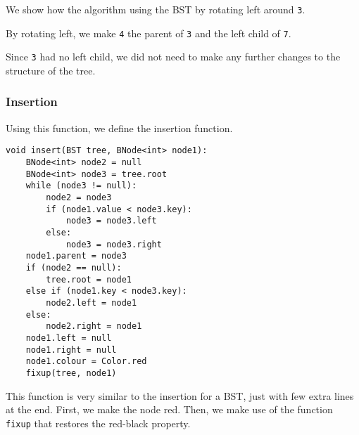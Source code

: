 \documentclass[a4paper, openany]{memoir}
\begin{document}
\noindent We show how the algorithm using the BST by rotating left around \texttt{3}.
\begin{center}
\end{center}
By rotating left, we make \texttt{4} the parent of \texttt{3} and the left child of \texttt{7}.
\begin{center}
\end{center}
Since \texttt{3} had no left child, we did not need to make any further changes to the structure of the tree.

\subsubsection{Insertion}
Using this function, we define the insertion function.
\begin{lstlisting}[language=pseudocode]
void insert(BST tree, BNode<int> node1):
    BNode<int> node2 = null
    BNode<int> node3 = tree.root
    while (node3 != null):
        node2 = node3
        if (node1.value < node3.key):
            node3 = node3.left
        else:
            node3 = node3.right
    node1.parent = node3
    if (node2 == null):
        tree.root = node1
    else if (node1.key < node3.key):
        node2.left = node1
    else:
        node2.right = node1
    node1.left = null
    node1.right = null
    node1.colour = Color.red
    fixup(tree, node1)
\end{lstlisting}
This function is very similar to the insertion for a BST, just with few extra lines at the end. First, we make the node red. Then, we make use of the function \texttt{fixup} that restores the red-black property.
\end{document}
